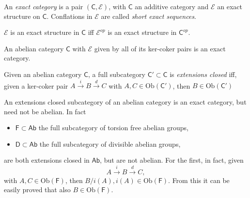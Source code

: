 \begin{defn}
	An {\em exact category} is a pair $\left(\mathsf{C}, \mathcal{E}\right)$, with $\mathsf{C}$ an additive category and $\mathcal{E}$ an exact structure on $\mathsf{C}$.
	Conflations in $\mathcal{E}$ are called {\em short exact sequences}.
\end{defn}

\begin{rem}
	$\mathcal{E}$ is an exact structure in $\mathsf{C}$ iff $\mathcal{E}^{op}$ is an exact structure in $\mathsf{C}^{op}$.
\end{rem}

\begin{rem}
	An abelian category $\mathsf{C}$ with $\mathcal{E}$ given by all of its ker-coker pairs is an exact category.
\end{rem}

\begin{defn}
	Given an abelian category $\mathsf{C}$, a full subcategory $\mathsf{C}' \subset \mathsf{C}$ is {\em extensions closed} iff, given a ker-coker pair
	$A \xrightarrow{i} B \xrightarrow{d} C$ with $A, C \in \mathrm{Ob} \left(\mathsf{C}'\right)$, then $B \in \mathrm{Ob} \left(\mathsf{C}'\right)$
\end{defn}

\begin{rem}
	An extensions closed subcategory of an abelian category is an exact category, but need not be abelian.
	In fact
	\begin{itemize}
		\item $\mathsf{F} \subset \mathsf{Ab}$ the full subcategory of torsion free abelian groups,
		\item $\mathsf{D} \subset \mathsf{Ab}$ the full subcategory of divisible abelian groups,
	\end{itemize}
	are both extensions closed in $\mathsf{Ab}$, but are not abelian.
	For the first, in fact, given
	\begin{equation}
	A \xrightarrow{i} B \xrightarrow{d} C
	,\end{equation} 
	with $A, C \in \mathrm{Ob} \left(\mathsf{F}\right)$, then $B/i(A), i(A) \in \mathrm{Ob} \left(\mathsf{F}\right)$.
	From this it can be easily proved that also $B \in \mathrm{Ob} \left(\mathsf{F}\right)$.
\end{rem}

